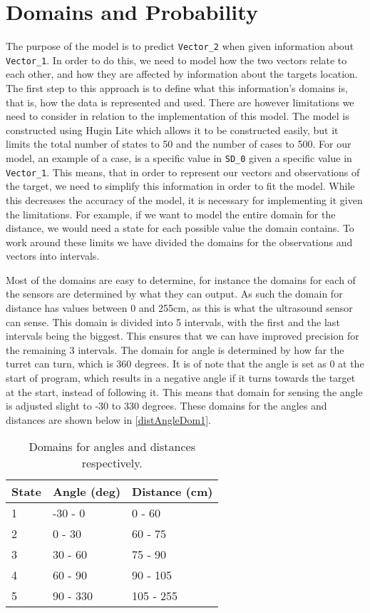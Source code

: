 \section{Domains and Probability}\label{MID}
The purpose of the model is to predict \texttt{Vector\_2} when given information
about \texttt{Vector\_1}. In order to do this, we need to model how the two
vectors relate to each other, and how they are affected by information about the
targets location. The first step to this approach is to define what this
information's domains is, that is, how the data is represented and used.
There are however limitations we need to consider in relation to the
implementation of this model. The model is constructed using Hugin Lite
\citep{Hugin} which allows it to be constructed easily, but it limits the total
number of states to 50 and the number of cases to 500. For our model, an example
of a case, is a specific value in \texttt{SD\_0} given a specific value in
\texttt{Vector\_1}. This means, that in order to represent our vectors and
observations of the target, we need to simplify this information in order to
fit the model. While this decreases the accuracy of the model, it is necessary
for implementing it given the limitations. For example, if we want to model the
entire domain for the distance, we would need a state for each possible value
the domain contains. To work around these limits we have divided the domains
for the observations and vectors into intervals.\nl

Most of the domains are easy to determine, for instance the domains for each of
the sensors are determined by what they can output. As such the domain for
distance has values between 0 and 255cm, as this is what the ultrasound sensor
can sense. This domain is divided into 5 intervals, with the first and the last
intervals being the biggest. This ensures that we can have improved precision
for the remaining 3 intervals. The domain for angle is determined by how far the
turret can turn, which is 360 degrees. It is of note that the angle is set as 0
at the start of program, which results in a negative angle if it turns towards the target at the
start, instead of following it. This means that domain for sensing the angle is
adjusted slight to -30 to 330 degrees. These domains for the angles and
distances are shown below in \autoref{distAngleDom1}. 

\begin{table}[H]
\centering
\begin{tabular}{l|l|l}
State & Angle (deg) & Distance (cm) \\ \hline
1     & -30 - 0     & 0 - 60        \\
2     & 0 - 30      & 60 - 75       \\
3     & 30 - 60     & 75 - 90       \\
4     & 60 - 90     & 90 - 105      \\
5     & 90 - 330    & 105 - 255     
\end{tabular}
\caption{Domains for angles and distances respectively.}
\label{distAngleDom1}
\end{table}


